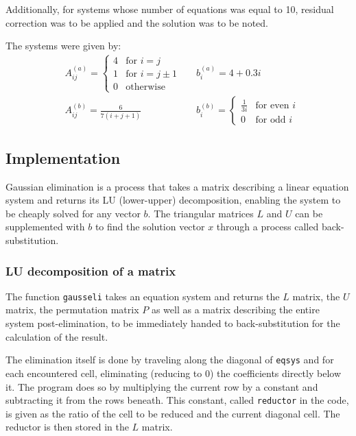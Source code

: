 \documentclass{article}
\begin{document}
	Additionally, for systems whose number of equations was equal to 10,
	residual correction was to be applied and the solution was to be noted.
	
	The systems were given by:
	\begin{align*}
		&A_{ij}^{(a)} =
		\begin{cases} 
			4 & \text{for } i = j \\
			1 & \text{for } i = j \pm 1 \\
			0 & \text{otherwise}
		\end{cases}
		&&
		b_i^{(a)} = 4 + 0.3i
		\\
		&A_{ij}^{(b)} = \frac{6}{7(i + j + 1)}
		&&
		b_i^{(b)} =
		\begin{cases} 
			\frac{1}{3i} & \text{for even } i\\
			0 & \text{for odd } i
		\end{cases}
	\end{align*}
	
	\subsection{Implementation}
	
	Gaussian elimination is a process that takes a matrix describing a linear
	equation system and returns its LU (lower-upper) decomposition, enabling the
	system to be cheaply solved for any vector $b$. The triangular matrices $L$
	and $U$ can be supplemented with $b$ to find the solution vector $x$ through
	a process called back-substitution.
	
	\subsubsection{LU decomposition of a matrix}
	
	The function \texttt{gausseli} takes an equation system and returns the $L$
	matrix, the $U$ matrix, the permutation matrix $P$ as well as a matrix
	describing the entire system post-elimination, to be immediately handed to
	back-substitution for the calculation of the result.
	
	The elimination itself is done by traveling along the diagonal of
	\texttt{eqsys} and for each encountered cell, eliminating (reducing to $0$)
	the coefficients directly below it. The program does so by multiplying the
	current row by a constant and subtracting it from the rows beneath.
	This constant, called \texttt{reductor} in the code, is given as the
	ratio of the cell to be reduced and the current diagonal cell. The reductor
	is then stored in the $L$ matrix.
	
\end{document}
